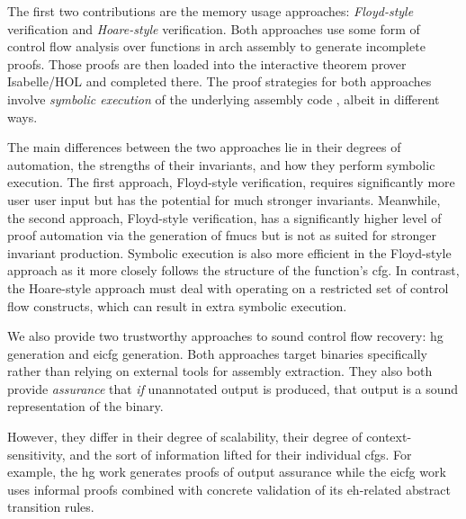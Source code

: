 The first two contributions are the memory usage approaches: \emph{Floyd-style} verification and \emph{Hoare-style} verification.
Both approaches use some form of control flow analysis over functions in \gls{arch} assembly to generate incomplete proofs.
Those proofs are then loaded into the interactive theorem prover Isabelle/HOL%
and completed there.
The proof strategies for both approaches involve \emph{symbolic execution} of the underlying assembly code \autocite{king1976symbolic}, albeit in different ways.

The main differences between the two approaches lie in their degrees of automation, the strengths of their invariants, and how they perform symbolic execution.
The first approach, Floyd-style verification, requires significantly more user user input but has the potential for much stronger invariants.
Meanwhile, the second approach, Floyd-style verification, has a significantly higher level of proof automation via the generation of \acp{fmuc} but is not as suited for stronger invariant production.
Symbolic execution is also more efficient in the Floyd-style approach as it more closely follows the structure of the function's \ac{cfg}.
In contrast, the Hoare-style approach must deal with operating on a restricted set of control flow constructs, which can result in extra symbolic execution.

We also provide two trustworthy approaches to sound control flow recovery: \ac{hg} generation and \ac{eicfg} generation.
Both approaches target binaries specifically rather than relying on external tools for assembly extraction.
They also both provide \emph{assurance} that \emph{if} unannotated output is produced, that output is a sound representation of the binary.

However, they differ in their degree of scalability, their degree of context-sensitivity, and the sort of information lifted for their individual \acp{cfg}.
For example, the \ac{hg} work generates proofs of output assurance while the \ac{eicfg} work uses informal proofs combined with concrete validation of its \ac{eh}-related abstract transition rules.

\begin{comment}
  For example, we have shown that we can formally verify approximately \num{12000} lines of assembly code obtained by disassembling binaries of the Xen hypervisor \autocite{xen} with minimal user interaction.

  To fill the latter gap, we provide binary-level approaches to dealing with complex, interprocedural control flow in the presence of indirect branches and even exceptions.
  First, a more general \emph{\ac{hg}} approach, followed by one focused specifically on \emph{exceptional control flow}, \emph{\acp{eicfg}}.
  We have found no other approaches that lift binaries to \ac{eicfg}-like constructs.
\end{comment}

